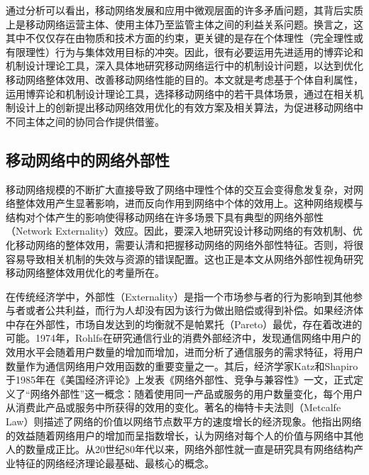 通过分析可以看出，移动网络发展和应用中微观层面的许多矛盾问题，其背后实质上是移动网络运营主体、使用主体乃至监管主体之间的利益关系问题。换言之，这其中不仅仅存在由物质和技术方面的约束，更关键的是存在个体理性（完全理性或有限理性）行为与集体效用目标的冲突。因此，很有必要运用先进适用的博弈论和机制设计理论工具，深入具体地研究移动网络运行中的机制设计问题，以达到优化移动网络整体效用、改善移动网络性能的目的。本文就是考虑基于个体自利属性，运用博弈论和机制设计理论工具，选择移动网络中的若干具体场景，通过在相关机制设计上的创新提出移动网络效用优化的有效方案及相关算法，为促进移动网络中不同主体之间的协同合作提供借鉴。

\subsection{移动网络中的网络外部性}

移动网络规模的不断扩大直接导致了网络中理性个体的交互会变得愈发复杂，对网络整体效用产生显著影响，进而反向作用到网络中个体的效用上。这种网络规模与结构对个体产生的影响使得移动网络在许多场景下具有典型的{\kaishu 网络外部性（Network Externality）}效应。因此，要深入地研究设计移动网络的有效机制、优化移动网络的整体效用，需要认清和把握移动网络的网络外部性特征。否则，将很容易导致相关机制的失效与资源的错误配置。这也正是本文从网络外部性视角研究移动网络整体效用优化的考量所在。

在传统经济学中，外部性（Externality）是指一个市场参与者的行为影响到其他参与者或者公共利益，而行为人却没有因为该行为做出赔偿或得到补偿。如果经济体中存在外部性，市场自发达到的均衡就不是帕累托（Pareto）最优，存在着改进的可能。1974年，Rohlfs\cite{Rolfs}在研究通信行业的消费外部经济中，发现通信网络中用户的效用水平会随着用户数量的增加而增加，进而分析了通信服务的需求特征，将用户数量作为通信网络用户效用函数的重要变量之一。其后，经济学家Katz和Shapiro 于1985年在《美国经济评论》上发表《网络外部性、竞争与兼容性》一文，正式定义了“网络外部性”这一概念：随着使用同一产品或服务的用户数量变化，每个用户从消费此产品或服务中所获得的效用的变化\cite{Katz}。著名的梅特卡夫法则（Metcalfe Law）则描述了网络的价值以网络节点数平方的速度增长的经济现象。他指出网络的效益随着网络用户的增加而呈指数增长，认为网络对每个人的价值与网络中其他人的数量成正比。从20世纪80年代以来，网络外部性就一直是研究具有网络结构产业特征的网络经济理论最基础、最核心的概念。

